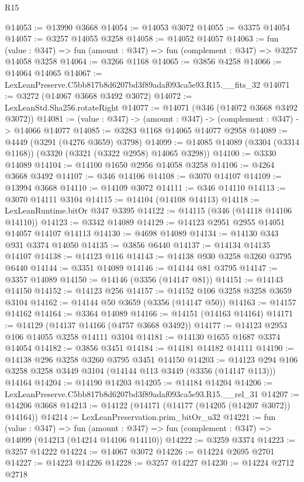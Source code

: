 \begin{lexlean}{R15}
\begin{coremodule}
@14053 := @13990 @3668
@14054 := @14053 @3072
@14055 := @3375 @14054
@14057 := @3257 @14055 @3258
@14058 := @14052 @14057
@14063 := fun (value : @347) => fun (amount : @347) => fun (complement : @347) => @3257 @14058 @3258
@14064 := @3266 @1168
@14065 := @3856 @4258
@14066 := @14064 @14065
@14067 := LexLeanPreserve.C5bb817b8d6207bd3f89adaf093ca5e93.R15.__fits_32
@14071 := @3272 (@14067 @3668 @3492 @3072)
@14072 := LexLeanStd.Sha256.rotateRight
@14077 := @14071 (@346 (@14072 @3668 @3492 @3072))
@14081 := (value : @347) -> (amount : @347) -> (complement : @347) -> @14066 @14077
@14085 := @3283 @1168 @14065 @14077 @2958
@14089 := @4449 (@3291 (@4276 @3659) @3798)
@14099 := @14085 @14089 (@3304 (@3314 @1168)) (@3320 (@3321 (@3322 @2958) @14065 @3298))
@14100 := @3330 @14089
@14104 := @14100 @1650 @2956 @14058 @3258
@14106 := @4264 @3668 @3492
@14107 := @346 @14106
@14108 := @3070 @14107
@14109 := @13994 @3668
@14110 := @14109 @3072
@14111 := @346 @14110
@14113 := @3070 @14111 @3104
@14115 := @14104 (@14108 @14113)
@14118 := LexLeanRuntime.bitOr @347 @3395
@14122 := @14115 (@346 (@14118 @14106 @14110))
@14123 := @3342 @14089
@14129 := @14123 @2951 @2955 @14051 @14057 @14107 @14113
@14130 := @4698 @14089
@14134 := @14130 @343 @931 @3374 @14050
@14135 := @3856 @6440
@14137 := @14134 @14135 @14107
@14138 := @14123 @116
@14143 := @14138 @930 @3258 @3260 @3795 @6440
@14144 := @3351 @14089
@14146 := @14144 @81 @3795
@14147 := @3357 @14089
@14150 := @14146 (@3356 (@14147 @81))
@14151 := @14143 @14150
@14152 := @14123 @256
@14157 := @14152 @106 @3258 @3258 @3659 @3104
@14162 := @14144 @50 @3659 (@3356 (@14147 @50))
@14163 := @14157 @14162
@14164 := @3364 @14089
@14166 := @14151 (@14163 @14164)
@14171 := @14129 (@14137 @14166 (@4757 @3668 @3492))
@14177 := @14123 @2953 @106 @14055 @3258 @14111 @3104
@14181 := @14130 @1655 @1687 @3374 @14054
@14182 := @3856 @3451
@14184 := @14181 @14182 @14111
@14190 := @14138 @296 @3258 @3260 @3795 @3451 @14150
@14203 := @14123 @294 @106 @3258 @3258 @3449 @3104 (@14144 @113 @3449 (@3356 (@14147 @113))) @14164
@14204 := @14190 @14203
@14205 := @14184 @14204
@14206 := LexLeanPreserve.C5bb817b8d6207bd3f89adaf093ca5e93.R15.__rel_31
@14207 := @14206 @3668
@14213 := @14122 (@14171 (@14177 (@14205 (@14207 @3072)) @14164))
@14214 := LexLeanPreservation.prim_bitOr_u32
@14221 := fun (value : @347) =>
  fun (amount : @347) => fun (complement : @347) => @14099 (@14213 (@14214 @14106 @14110))
@14222 := @3259 @3374
@14223 := @3257 @14222
@14224 := @14067 @3072
@14226 := @14224 @2695 @2701
@14227 := @14223 @14226
@14228 := @3257 @14227
@14230 := @14224 @2712 @2718

\end{coremodule}
\end{lexlean}

